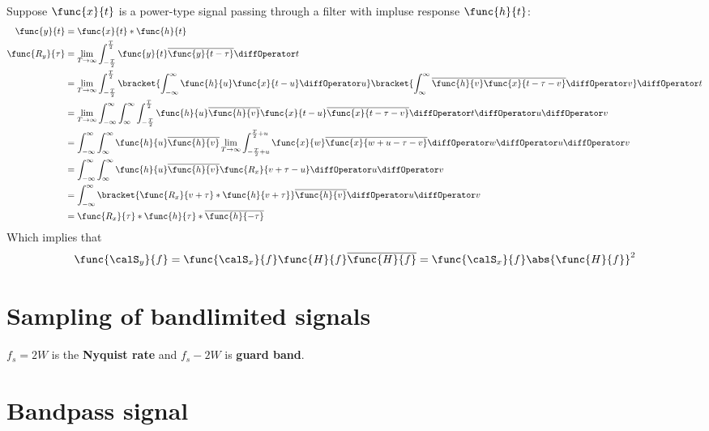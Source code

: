 Suppose \(\func{x}{t}\) is a power-type signal passing through a filter with impluse response \(\func{h}{t}\):
\begin{align*}
    \func{y}{t} &= \func{x}{t} \ast \func{h}{t}\\
    \func{R_y}{\tau} &= \lim_{T \to \infty} \int_{-\frac{T}{2}}^{\frac{T}{2}} \func{y}{t} \overline{\func{y}{t - \tau}} \diffOperator t\\
    &= \lim_{T \to \infty} \int_{-\frac{T}{2}}^{\frac{T}{2}}\bracket{\int_{-\infty}^{\infty} \func{h}{u} \func{x}{t - u} \diffOperator u} \bracket{\int_{\infty}^{\infty} \overline{\func{h}{v}} \overline{\func{x}{t - \tau - v}} \diffOperator v }  \diffOperator t\\
    &= \lim_{T \to \infty} \int_{-\infty}^{\infty} \int_{\infty}^{\infty} \int_{-\frac{T}{2}}^{\frac{T}{2}}  \func{h}{u} \overline{\func{h}{v}}  \func{x}{t - u}  \overline{\func{x}{t - \tau - v}}  \diffOperator t \diffOperator u \diffOperator v\\
    &= \int_{-\infty}^{\infty} \int_{\infty}^{\infty}  \func{h}{u} \overline{\func{h}{v}} \lim_{T \to \infty}  \int_{-\frac{T}{2} + u}^{\frac{T}{2} +u} \func{x}{w}   \overline{\func{x}{w + u - \tau - v}}  \diffOperator w \diffOperator u \diffOperator v\\
    &= \int_{-\infty}^{\infty} \int_{\infty}^{\infty}  \func{h}{u} \overline{\func{h}{v}}\func{R_x}{v + \tau - u} \diffOperator u \diffOperator v\\
    &=  \int_{-\infty}^{\infty}   \bracket{\func{R_x}{v + \tau }  \ast \func{h}{v + \tau}} \overline{\func{h}{v}}\diffOperator u \diffOperator v\\
    &= \func{R_x}{\tau }  \ast \func{h}{\tau} \ast \overline{\func{h}{-\tau}}
\end{align*}
Which implies that 
\begin{equation*}
    \func{\calS_y}{f} = \func{\calS_x}{f} \func{H}{f} \overline{\func{H}{f}} = \func{\calS_x}{f} \abs{\func{H}{f}}^2
\end{equation*}
\section{Sampling of bandlimited signals}
\(f_s = 2W\) is the \textbf{Nyquist rate} and \(f_s -  2W\) is \textbf{guard band}.
\section{Bandpass signal}